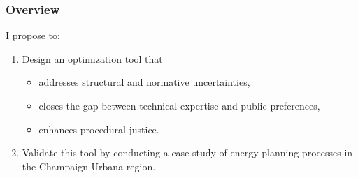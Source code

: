 \begin{frame}
    \frametitle{Overview}

    I propose to:

    \begin{enumerate}
        \item Design an optimization tool that
        \begin{itemize}
            \item addresses structural and normative uncertainties,
            \item closes the gap between technical expertise and public preferences,
            \item enhances procedural justice.
        \end{itemize}
        \item Validate this tool by conducting a case study of energy planning processes
        in the Champaign-Urbana region.
    \end{enumerate}

\end{frame}